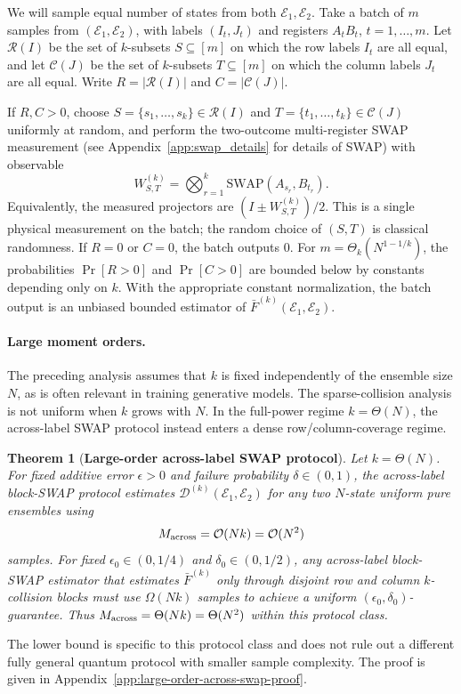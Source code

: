 \documentclass[aps,prx,reprint,superscriptaddress,amsmath,amssymb,longbibliography,floatfix]{revtex4-2}
\newcommand{\scC}{\mathcal{C}}
\newcommand{\scD}{\mathcal{D}}
\newcommand{\scE}{\mathcal{E}}
\newcommand{\scO}{\mathcal{O}}
\newcommand{\scR}{\mathcal{R}}
\theoremstyle{plain}
\newtheorem{theorem}{Theorem}[section]
\theoremstyle{definition}
\theoremstyle{remark}
\begin{document}
We will sample equal number of states from both $\scE_1,\scE_2$. Take a batch of $m$ samples from $(\scE_1,\scE_2)$, with labels $(I_t,J_t)$ and registers $A_tB_t$, $t=1,\ldots,m$. Let $\scR(I)$ be the set of $k$-subsets $S\subseteq[m]$ on which the row labels $I_t$ are all equal, and let $\scC(J)$ be the set of $k$-subsets $T\subseteq[m]$ on which the column labels $J_t$ are all equal. Write $R=|\scR(I)|$ and $C=|\scC(J)|$.

If $R,C>0$, choose $S=\{s_1,\ldots,s_k\}\in\scR(I)$ and $T=\{t_1,\ldots,t_k\}\in\scC(J)$ uniformly at random, and perform the two-outcome multi-register SWAP measurement (see Appendix~\ref{app:swap_details} for details of SWAP) with observable
$$
W_{S,T}^{(k)}=\bigotimes_{r=1}^k \mathrm{SWAP}(A_{s_r},B_{t_r}).
$$
Equivalently, the measured projectors are $(I\pm W_{S,T}^{(k)})/2$. This is a single physical measurement on the batch; the random choice of $(S,T)$ is classical randomness. If $R=0$ or $C=0$, the batch outputs $0$. For $m=\Theta_k(N^{1-1/k})$, the probabilities $\Pr[R>0]$ and $\Pr[C>0]$ are bounded below by constants depending only on $k$. With the appropriate constant normalization, the batch output is an unbiased bounded estimator of $\bar F^{(k)}(\scE_1,\scE_2)$. 

\paragraph{Large moment orders.}
The preceding analysis assumes that $k$ is fixed independently of the ensemble size $N$, as is often relevant in training generative models. The sparse-collision analysis is not uniform when $k$ grows with $N$. In the full-power regime $k=\Theta(N)$, the across-label SWAP protocol instead enters a dense row/column-coverage regime.

\begin{theorem}[\textbf{Large-order across-label SWAP protocol}]
\label{thm:large-order-across-swap}
Let $k=\Theta(N)$. For fixed additive error $\epsilon>0$ and failure probability $\delta\in(0,1)$, the across-label block-SWAP protocol estimates $\scD^{(k)}(\scE_1,\scE_2)$ for any two $N$-state uniform pure ensembles using
\[
    M_{\rm across}=\scO(Nk)=\scO(N^2)
\]
samples. For fixed $\epsilon_0\in(0,1/4)$ and $\delta_0\in(0,1/2)$, any across-label block-SWAP estimator that estimates $\bar F^{(k)}$ only through disjoint row and column $k$-collision blocks must use $\Omega(Nk)$ samples to achieve a uniform $(\epsilon_0,\delta_0)$-guarantee. Thus $M_{\rm across}=\Theta(Nk)=\Theta(N^2)$ within this protocol class.
\end{theorem}
The lower bound is specific to this protocol class and does not rule out a different fully general quantum protocol with smaller sample complexity. The proof is given in Appendix~\ref{app:large-order-across-swap-proof}.
\end{document}
